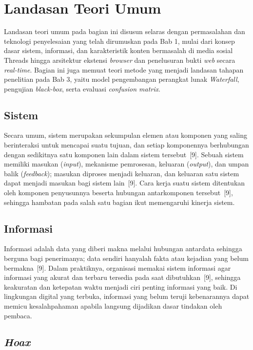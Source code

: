 \documentclass[12pt,a4paper,twoside]{report}
\begin{document}
\section{Landasan Teori Umum}

Landasan teori umum pada bagian ini disusun selaras dengan permasalahan dan teknologi penyelesaian yang telah dirumuskan pada Bab 1, mulai dari konsep dasar sistem, informasi, dan karakteristik konten bermasalah di media sosial Threads hingga arsitektur ekstensi \textit{browser} dan penelusuran bukti \textit{web} secara \textit{real-time}. Bagian ini juga memuat teori metode yang menjadi landasan tahapan penelitian pada Bab 3, yaitu model pengembangan perangkat lunak \textit{Waterfall}, pengujian \textit{black-box}, serta evaluasi \textit{confusion matrix}.

\subsection{Sistem}

Secara umum, sistem merupakan sekumpulan elemen atau komponen yang saling berinteraksi untuk mencapai suatu tujuan, dan setiap komponennya berhubungan dengan sedikitnya satu komponen lain dalam sistem tersebut~[9]. Sebuah sistem memiliki masukan (\textit{input}), mekanisme pemrosesan, keluaran (\textit{output}), dan umpan balik (\textit{feedback}); masukan diproses menjadi keluaran, dan keluaran satu sistem dapat menjadi masukan bagi sistem lain~[9]. Cara kerja suatu sistem ditentukan oleh komponen penyusunnya beserta hubungan antarkomponen tersebut~[9], sehingga hambatan pada salah satu bagian ikut memengaruhi kinerja sistem.

\subsection{Informasi}

Informasi adalah data yang diberi makna melalui hubungan antardata sehingga berguna bagi penerimanya; data sendiri hanyalah fakta atau kejadian yang belum bermakna~[9]. Dalam praktiknya, organisasi memakai sistem informasi agar informasi yang akurat dan terbaru tersedia pada saat dibutuhkan~[9], sehingga keakuratan dan ketepatan waktu menjadi ciri penting informasi yang baik. Di lingkungan digital yang terbuka, informasi yang belum teruji kebenarannya dapat memicu kesalahpahaman apabila langsung dijadikan dasar tindakan oleh pembaca.

\subsection{\textit{Hoax}}
\end{document}
